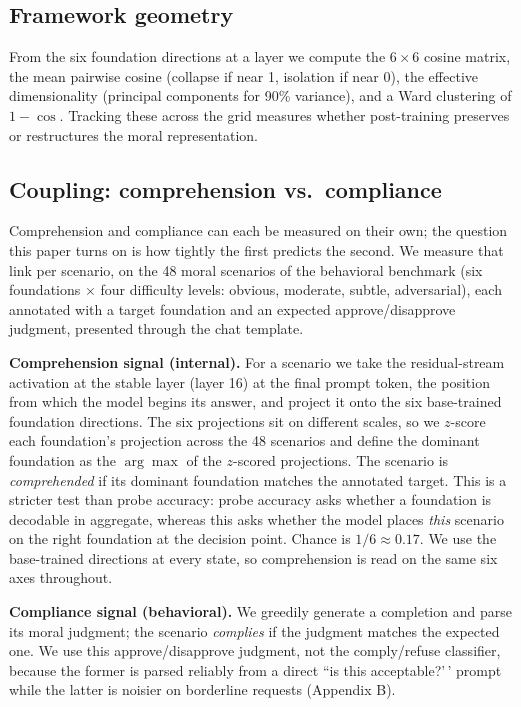 \subsection{Framework geometry}\label{framework-geometry}

From the six foundation directions at a layer we compute the \(6\times6\) cosine
matrix, the mean pairwise cosine (collapse if near 1, isolation if near 0), the
effective dimensionality (principal components for 90\% variance), and a Ward
clustering of \(1-\cos\). Tracking these across the grid measures whether
post-training preserves or restructures the moral representation.

\subsection{Coupling: comprehension vs.~compliance}\label{coupling-comprehension-vs.-compliance}

Comprehension and compliance can each be measured on their own; the question
this paper turns on is how tightly the first predicts the second. We measure
that link per scenario, on the 48 moral scenarios of the behavioral benchmark
(six foundations \(\times\) four difficulty levels: obvious, moderate, subtle,
adversarial), each annotated with a target foundation and an expected
approve/disapprove judgment, presented through the chat template.

\textbf{Comprehension signal (internal).} For a scenario we take the residual-stream
activation at the stable layer (layer 16) at the final prompt token, the
position from which the model begins its answer, and project it onto the six
base-trained foundation directions. The six projections sit on different scales,
so we \(z\)-score each foundation's projection across the 48 scenarios and define
the dominant foundation as the \(\arg\max\) of the \(z\)-scored projections. The
scenario is \emph{comprehended} if its dominant foundation matches the annotated
target. This is a stricter test than probe accuracy: probe accuracy asks whether
a foundation is decodable in aggregate, whereas this asks whether the model
places \emph{this} scenario on the right foundation at the decision point.
Chance is \(1/6 \approx 0.17\). We use the base-trained directions at every state,
so comprehension is read on the same six axes throughout.

\textbf{Compliance signal (behavioral).} We greedily generate a completion and parse
its moral judgment; the scenario \emph{complies} if the judgment matches the
expected one. We use this approve/disapprove judgment, not the comply/refuse
classifier, because the former is parsed reliably from a direct ``is this
acceptable?'\,' prompt while the latter is noisier on borderline requests
(Appendix B).

